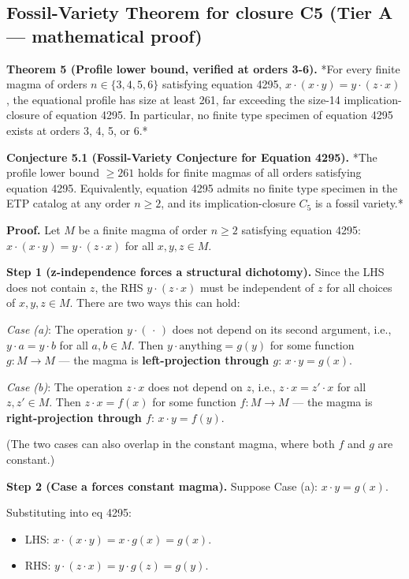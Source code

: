 \documentclass[11pt,reqno]{amsart}
\theoremstyle{plain}
\theoremstyle{definition}
\begin{document}
\subsection{Fossil-Variety Theorem for closure C5 (Tier A --- mathematical proof)}

\textbf{Theorem 5 (Profile lower bound, verified at orders 3-6).} *For every finite magma of orders $n \in \{3, 4, 5, 6\}$ satisfying equation 4295, $x \cdot (x \cdot y) = y \cdot (z \cdot x)$, the equational profile has size at least 261, far exceeding the size-14 implication-closure of equation 4295. In particular, no finite type specimen of equation 4295 exists at orders 3, 4, 5, or 6.*

\textbf{Conjecture 5.1 (Fossil-Variety Conjecture for Equation 4295).} *The profile lower bound $\geq 261$ holds for finite magmas of all orders satisfying equation 4295. Equivalently, equation 4295 admits no finite type specimen in the ETP catalog at any order $n \geq 2$, and its implication-closure $C_5$ is a fossil variety.*

\textbf{Proof.} Let $M$ be a finite magma of order $n \geq 2$ satisfying equation 4295: $x \cdot (x \cdot y) = y \cdot (z \cdot x)$ for all $x, y, z \in M$.

\textbf{Step 1 (z-independence forces a structural dichotomy).} Since the LHS does not contain $z$, the RHS $y \cdot (z \cdot x)$ must be independent of $z$ for all choices of $x, y, z \in M$. There are two ways this can hold:

\textit{Case (a)}: The operation $y \cdot (\,\cdot\,)$ does not depend on its second argument, i.e., $y \cdot a = y \cdot b$ for all $a, b \in M$. Then $y \cdot \text{anything} = g(y)$ for some function $g : M \to M$ --- the magma is \textbf{left-projection through $g$}: $x \cdot y = g(x)$.

\textit{Case (b)}: The operation $z \cdot x$ does not depend on $z$, i.e., $z \cdot x = z' \cdot x$ for all $z, z' \in M$. Then $z \cdot x = f(x)$ for some function $f : M \to M$ --- the magma is \textbf{right-projection through $f$}: $x \cdot y = f(y)$.

(The two cases can also overlap in the constant magma, where both $f$ and $g$ are constant.)

\textbf{Step 2 (Case a forces constant magma).} Suppose Case (a): $x \cdot y = g(x)$.

Substituting into eq 4295:
\begin{itemize}
\item LHS: $x \cdot (x \cdot y) = x \cdot g(x) = g(x)$.
\item RHS: $y \cdot (z \cdot x) = y \cdot g(z) = g(y)$.
\end{itemize}
\end{document}
